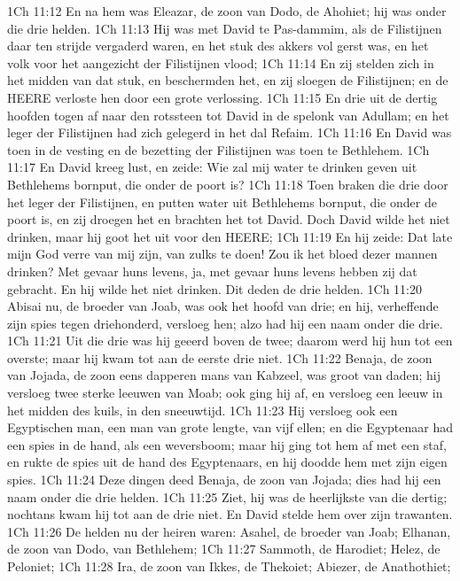 1Ch 11:12  En na hem was Eleazar, de zoon van Dodo, de Ahohiet; hij was onder die drie helden.
1Ch 11:13  Hij was met David te Pas-dammim, als de Filistijnen daar ten strijde vergaderd waren, en het stuk des akkers vol gerst was, en het volk voor het aangezicht der Filistijnen vlood;
1Ch 11:14  En zij stelden zich in het midden van dat stuk, en beschermden het, en zij sloegen de Filistijnen; en de HEERE verloste hen door een grote verlossing.
1Ch 11:15  En drie uit de dertig hoofden togen af naar den rotssteen tot David in de spelonk van Adullam; en het leger der Filistijnen had zich gelegerd in het dal Refaim.
1Ch 11:16  En David was toen in de vesting en de bezetting der Filistijnen was toen te Bethlehem.
1Ch 11:17  En David kreeg lust, en zeide: Wie zal mij water te drinken geven uit Bethlehems bornput, die onder de poort is?
1Ch 11:18  Toen braken die drie door het leger der Filistijnen, en putten water uit Bethlehems bornput, die onder de poort is, en zij droegen het en brachten het tot David. Doch David wilde het niet drinken, maar hij goot het uit voor den HEERE;
1Ch 11:19  En hij zeide: Dat late mijn God verre van mij zijn, van zulks te doen! Zou ik het bloed dezer mannen drinken? Met gevaar huns levens, ja, met gevaar huns levens hebben zij dat gebracht. En hij wilde het niet drinken. Dit deden de drie helden.
1Ch 11:20  Abisai nu, de broeder van Joab, was ook het hoofd van drie; en hij, verheffende zijn spies tegen driehonderd, versloeg hen; alzo had hij een naam onder die drie.
1Ch 11:21  Uit die drie was hij geeerd boven de twee; daarom werd hij hun tot een overste; maar hij kwam tot aan de eerste drie niet.
1Ch 11:22  Benaja, de zoon van Jojada, de zoon eens dapperen mans van Kabzeel, was groot van daden; hij versloeg twee sterke leeuwen van Moab; ook ging hij af, en versloeg een leeuw in het midden des kuils, in den sneeuwtijd.
1Ch 11:23  Hij versloeg ook een Egyptischen man, een man van grote lengte, van vijf ellen; en die Egyptenaar had een spies in de hand, als een weversboom; maar hij ging tot hem af met een staf, en rukte de spies uit de hand des Egyptenaars, en hij doodde hem met zijn eigen spies.
1Ch 11:24  Deze dingen deed Benaja, de zoon van Jojada; dies had hij een naam onder die drie helden.
1Ch 11:25  Ziet, hij was de heerlijkste van die dertig; nochtans kwam hij tot aan de drie niet. En David stelde hem over zijn trawanten.
1Ch 11:26  De helden nu der heiren waren: Asahel, de broeder van Joab; Elhanan, de zoon van Dodo, van Bethlehem;
1Ch 11:27  Sammoth, de Harodiet; Helez, de Peloniet;
1Ch 11:28  Ira, de zoon van Ikkes, de Thekoiet; Abiezer, de Anathothiet;
